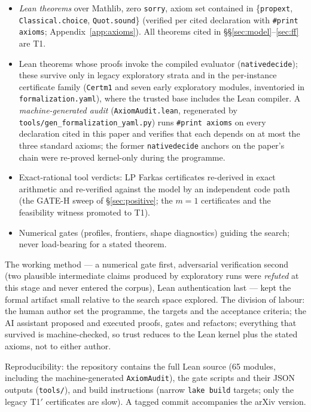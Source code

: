 \documentclass[11pt]{amsart}
\theoremstyle{definition}
\theoremstyle{remark}
\newcommand{\lean}[1]{{\def\_{\textunderscore\allowbreak}\texttt{#1}}}
\begin{document}
\begin{itemize}
\item[\textbf{T1}] \emph{Lean theorems} over Mathlib, zero \texttt{sorry},
  axiom set contained in \{\lean{propext}, \lean{Classical.choice},
  \lean{Quot.sound}\} (verified per cited declaration with
  \lean{\#print axioms}; Appendix~\ref{app:axioms}).  All theorems cited in
  \S\S\ref{sec:model}--\ref{sec:ff} are T1.
\item[\textbf{T1$'$}] Lean theorems whose proofs invoke the compiled
  evaluator (\lean{native\_decide}); these survive only in legacy
  exploratory strata and in the per-instance certificate family
  (\lean{Cert\_m1\_*} and seven early exploratory modules, inventoried in
  \texttt{formalization.yaml}), where the trusted base includes the Lean
  compiler.  A \emph{machine-generated audit}
  (\lean{AxiomAudit.lean}, regenerated by
  \texttt{tools/gen\_formalization\_yaml.py}) runs \lean{\#print axioms} on
  every declaration cited in this paper and verifies that each depends on
  at most the three standard axioms; the former \lean{native\_decide}
  anchors on the paper's chain were re-proved kernel-only during the
  programme.
\item[\textbf{T2}] Exact-rational tool verdicts: LP Farkas certificates
  re-derived in exact arithmetic and re-verified against the model by an
  independent code path (the GATE-H sweep of \S\ref{sec:positive}; the
  $m=1$ certificates and the feasibility witness promoted to T1).
\item[\textbf{T3}] Numerical gates (profiles, frontiers, shape diagnostics)
  guiding the search; never load-bearing for a stated theorem.
\end{itemize}

The working method --- a numerical gate first, adversarial verification
second (two plausible intermediate claims produced by exploratory runs were
\emph{refuted} at this stage and never entered the corpus), Lean
authentication last --- kept the formal artifact small relative to the
search space explored.  The division of labour: the human author set the
programme, the targets and the acceptance criteria; the AI assistant
proposed and executed proofs, gates and refactors; everything that survived
is machine-checked, so trust reduces to the Lean kernel plus the stated
axioms, not to either author.

Reproducibility: the repository contains the full Lean source (65 modules,
including the machine-generated \lean{AxiomAudit}),
the gate scripts and their JSON outputs (\texttt{tools/}), and build
instructions (narrow \texttt{lake build} targets; only the legacy T1$'$
certificates are slow).  A tagged commit accompanies the arXiv version.
\end{document}

